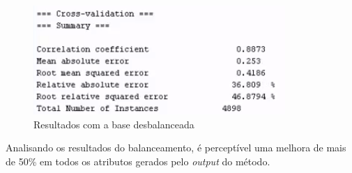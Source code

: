 \documentclass[12pt]{article}
\begin{document}
\begin{figure}[h]
	\begin{small}
		\begin{center}
			\includegraphics[]{figures/2.png}
		\end{center}
		\caption{Resultados com a base desbalanceada}
		\label{fig:ballanced}
	\end{small}
\end{figure}

Analisando os resultados do balanceamento, é perceptível uma melhora de mais de 50\% em todos os atributos gerados pelo \textit{output} do método.






\end{document}
